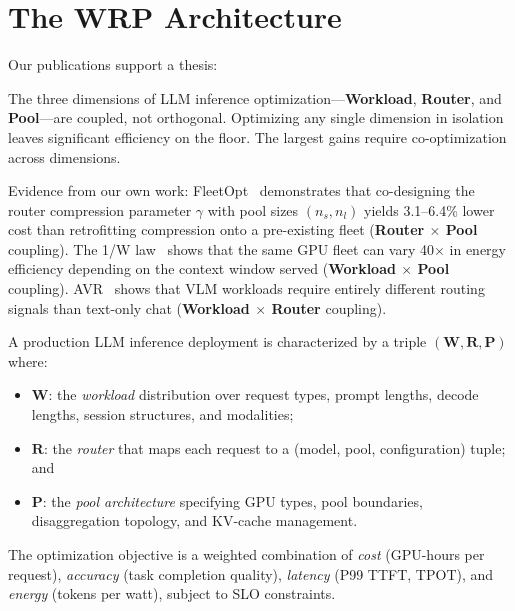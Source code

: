 \section{The WRP Architecture}
\label{sec:wrp}



Our publications support a thesis:

\begin{thesis}
\label{thesis:wrp}
The three dimensions of LLM inference optimization---\textbf{Workload},
\textbf{Router}, and \textbf{Pool}---are coupled, not orthogonal.
Optimizing any single dimension in isolation leaves significant
efficiency on the floor.  The largest gains require co-optimization
across dimensions.
\end{thesis}

Evidence from our own work: FleetOpt~\cite{fleetopt2026} demonstrates
that co-designing the router compression parameter $\gamma$ with pool
sizes $(n_s, n_l)$ yields 3.1--6.4\% lower cost than retrofitting
compression onto a pre-existing fleet (\textbf{Router $\times$ Pool}
coupling).  The 1/W law~\cite{onewlaw2026} shows that the same GPU
fleet can vary 40$\times$ in energy efficiency depending on the context
window served (\textbf{Workload $\times$ Pool} coupling).
AVR~\cite{avr2026} shows that VLM workloads require entirely different
routing signals than text-only chat (\textbf{Workload $\times$ Router}
coupling).

\begin{definition}
A production LLM inference deployment is characterized by a triple
$(\mathbf{W}, \mathbf{R}, \mathbf{P})$ where:
\begin{itemize}[nosep]
  \item $\mathbf{W}$: the \emph{workload} distribution over request
        types, prompt lengths, decode lengths, session structures, and
        modalities;
  \item $\mathbf{R}$: the \emph{router} that maps each request to a
        (model, pool, configuration) tuple; and
  \item $\mathbf{P}$: the \emph{pool architecture} specifying GPU
        types, pool boundaries, disaggregation topology, and KV-cache
        management.
\end{itemize}
The optimization objective is a weighted combination of \emph{cost}
(GPU-hours per request), \emph{accuracy} (task completion quality),
\emph{latency} (P99 TTFT, TPOT), and \emph{energy} (tokens per watt),
subject to SLO constraints.
\end{definition}


